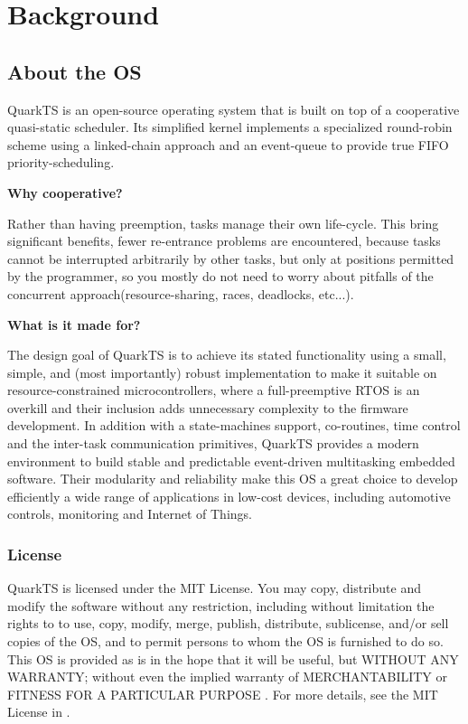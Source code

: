 \section{Background}
\subsection{About the OS}
QuarkTS is an open-source operating system that is built on top of a cooperative quasi-static scheduler. Its simplified kernel implements a specialized round-robin scheme using a linked-chain approach and an event-queue to provide true FIFO priority-scheduling.

\textbf{Why cooperative?}

Rather than having preemption,  tasks manage their own life-cycle. This bring significant benefits, fewer re-entrance problems are encountered, because tasks cannot be interrupted arbitrarily by other tasks, but only at positions permitted by the programmer, so you mostly do not need to worry about pitfalls of the concurrent approach(resource-sharing, races, deadlocks, etc...). 

\textbf{What is it made for?}

The design goal of QuarkTS is to achieve its stated functionality using a small, simple, and (most importantly) robust implementation to  make it suitable on resource-constrained microcontrollers, where a full-preemptive RTOS is an overkill and their inclusion adds unnecessary complexity to the firmware development. In addition with a state-machines support, co-routines, time control and the inter-task communication primitives, QuarkTS provides a modern environment to build stable and predictable event-driven multitasking embedded software. Their modularity and reliability make this OS a great choice to develop efficiently a wide range of applications in low-cost devices, including automotive controls, monitoring and Internet of Things.

\subsubsection{License}
QuarkTS is licensed under the MIT License. You may copy, distribute and modify the software without any restriction, including without limitation the rights to to use, copy, modify, merge, publish, distribute, sublicense, and/or sell copies of the OS, and to permit persons to whom the OS is furnished to do so. This OS is provided as is in the hope that it will be useful, but WITHOUT ANY WARRANTY; without even the implied warranty of MERCHANTABILITY or FITNESS FOR A PARTICULAR PURPOSE . 
For more details, see the MIT License in \cite{license}. 

